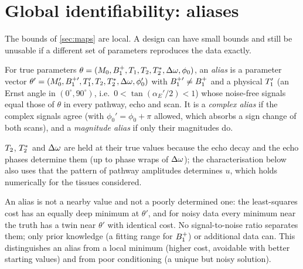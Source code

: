 \section{Global identifiability: aliases}\label{sec:aliases}

The bounds of \cref{sec:maps} are local. A design can have small bounds and still be unusable
if a different set of parameters reproduces the data exactly.

\begin{definition}[Alias]\label{def:alias}
For true parameters $\theta=(M_0,B_1^{+},T_1,T_2,T_2^{*},\Delta\omega,\phi_0)$, an \emph{alias} is a parameter vector
$\theta'=(M_0',B_1^{+\prime},T_1',T_2,T_2^{*},\Delta\omega,\phi_0')$ with $B_1^{+\prime}\ne B_1^{+}$ and a physical $T_1'$ (an Ernst angle in
$(0^\circ,90^\circ)$, i.e.\ $0<\tan(\alpha_E'/2)<1$) whose noise-free signals equal those of $\theta$ in every
pathway, echo and scan. It is a \emph{complex alias} if the complex signals agree (with $\phi_0'=\phi_0+\pi$
allowed, which absorbs a sign change of both scans), and a \emph{magnitude alias} if only their
magnitudes do.
\end{definition}

$T_2$, $T_2^{*}$ and $\Delta\omega$ are held at their true values because the echo decay and the echo phases
determine them (up to phase wraps of $\Delta\omega$); the characterisation below also uses that the pattern
of pathway amplitudes determines $u$, which holds numerically for the tissues considered.

An alias is not a nearby value and not a poorly determined one: the least-squares cost has an
equally deep minimum at $\theta'$, and for noisy data every minimum near the truth has a twin near
$\theta'$ with identical cost. No signal-to-noise ratio separates them; only prior knowledge (a
fitting range for $B_1^{+}$) or additional data can. This distinguishes an alias from a local minimum
(higher cost, avoidable with better starting values) and from poor conditioning (a unique but
noisy solution).

